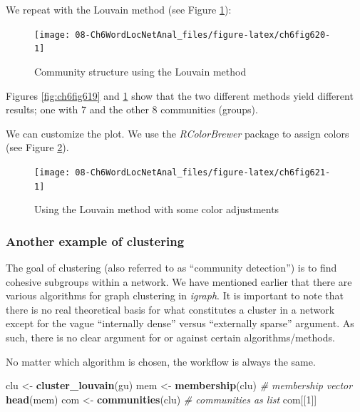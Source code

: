 \documentclass[
]{article}
\newenvironment{Shaded}{\begin{snugshade}}{\end{snugshade}}
\newcommand{\CommentTok}[1]{\textcolor[rgb]{0.56,0.35,0.01}{\textit{#1}}}
\newcommand{\DecValTok}[1]{\textcolor[rgb]{0.00,0.00,0.81}{#1}}
\newcommand{\FunctionTok}[1]{\textcolor[rgb]{0.13,0.29,0.53}{\textbf{#1}}}
\newcommand{\NormalTok}[1]{#1}
\newcommand{\OtherTok}[1]{\textcolor[rgb]{0.56,0.35,0.01}{#1}}
\begin{document}
We repeat with the Louvain method (see Figure \ref{fig:ch6fig620}):

\begin{figure}

{\centering \texttt{[image: 08-Ch6WordLocNetAnal\_files/figure-latex/ch6fig620-1]} 

}

\caption{Community structure using the Louvain method}\label{fig:ch6fig620}
\end{figure}

Figures \ref{fig:ch6fig619} and \ref{fig:ch6fig620} show that the two different methods yield different results; one with 7 and the other 8 communities (groups).

We can customize the plot. We use the \emph{RColorBrewer} package to assign colors (see Figure \ref{fig:ch6fig621}).

\begin{figure}

{\centering \texttt{[image: 08-Ch6WordLocNetAnal\_files/figure-latex/ch6fig621-1]} 

}

\caption{Using the Louvain method with some color adjustments}\label{fig:ch6fig621}
\end{figure}

\hypertarget{another-example-of-clustering}{%
\subsubsection{Another example of clustering}\label{another-example-of-clustering}}

The goal of clustering (also referred to as ``community detection'') is to find cohesive subgroups within a network. We have mentioned earlier that there are various algorithms for graph clustering in \emph{igraph}. It is important to note that there is no real theoretical basis for what constitutes a cluster in a network except for the vague ``internally dense'' versus ``externally sparse'' argument. As such, there is no clear argument for or against certain algorithms/methods.

No matter which algorithm is chosen, the workflow is always the same.

\footnotesize

\begin{Shaded}
\begin{Highlighting}[]
\NormalTok{clu }\OtherTok{\textless{}{-}} \FunctionTok{cluster\_louvain}\NormalTok{(gu)}
\NormalTok{mem }\OtherTok{\textless{}{-}} \FunctionTok{membership}\NormalTok{(clu) }\CommentTok{\# membership vector}
\FunctionTok{head}\NormalTok{(mem)}
\NormalTok{com }\OtherTok{\textless{}{-}} \FunctionTok{communities}\NormalTok{(clu) }\CommentTok{\# communities as list}
\NormalTok{com[[}\DecValTok{1}\NormalTok{]]}
\end{Highlighting}
\end{Shaded}
\end{document}
